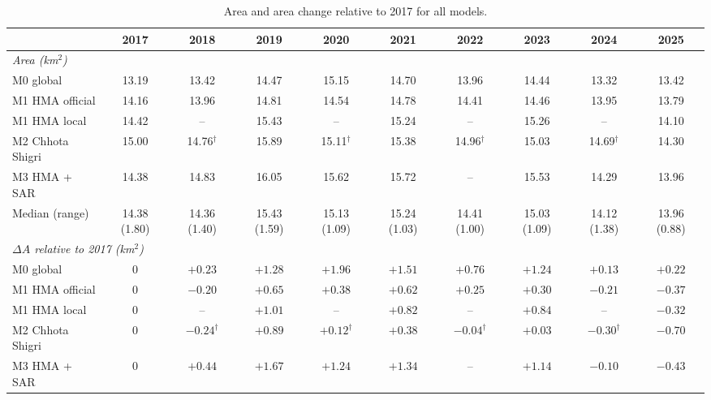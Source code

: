 \documentclass[10pt]{article}
\newcommand{\kmsq}{km$^2$}
\newcommand{\tr}{$^\dagger$}   %
\begin{document}
\begin{table}
\centering\footnotesize
\setlength{\tabcolsep}{3.5pt}
\begin{threeparttable}
\caption{Area and area change relative to 2017 for all models.}
\label{tab:all_models}
\begin{tabular}{l ccccccccc}
\toprule
 & \textbf{2017} & \textbf{2018} & \textbf{2019} & \textbf{2020} & \textbf{2021} & \textbf{2022} & \textbf{2023} & \textbf{2024} & \textbf{2025} \\
\midrule
\multicolumn{10}{l}{\textit{Area (\kmsq)}} \\
M0 global                          & 13.19 & 13.42 & 14.47 & 15.15 & 14.70 & 13.96 & 14.44 & 13.32 & 13.42 \\
M1 HMA official                    & 14.16 & 13.96 & 14.81 & 14.54 & 14.78 & 14.41 & 14.46 & 13.95 & 13.79 \\
M1 HMA local                       & 14.42 & -- & 15.43 & -- & 15.24 & -- & 15.26 & -- & 14.10 \\
M2 Chhota Shigri                   & 15.00 & 14.76\tr & 15.89 & 15.11\tr & 15.38 & 14.96\tr & 15.03 & 14.69\tr & 14.30 \\
M3 HMA + SAR                       & 14.38 & 14.83 & 16.05 & 15.62 & 15.72 & -- & 15.53 & 14.29 & 13.96 \\
Median (range)                     & 14.38 (1.80) & 14.36 (1.40) & 15.43 (1.59) & 15.13 (1.09) & 15.24 (1.03) & 14.41 (1.00) & 15.03 (1.09) & 14.12 (1.38) & 13.96 (0.88) \\
\midrule
\multicolumn{10}{l}{\textit{$\Delta A$ relative to 2017 (\kmsq)}} \\
M0 global                          & 0 & $+0.23$ & $+1.28$ & $+1.96$ & $+1.51$ & $+0.76$ & $+1.24$ & $+0.13$ & $+0.22$ \\
M1 HMA official                    & 0 & $-0.20$ & $+0.65$ & $+0.38$ & $+0.62$ & $+0.25$ & $+0.30$ & $-0.21$ & $-0.37$ \\
M1 HMA local                       & 0 & -- & $+1.01$ & -- & $+0.82$ & -- & $+0.84$ & -- & $-0.32$ \\
M2 Chhota Shigri                   & 0 & $-0.24$\tr & $+0.89$ & $+0.12$\tr & $+0.38$ & $-0.04$\tr & $+0.03$ & $-0.30$\tr & $-0.70$ \\
M3 HMA + SAR                       & 0 & $+0.44$ & $+1.67$ & $+1.24$ & $+1.34$ & -- & $+1.14$ & $-0.10$ & $-0.43$ \\

\end{tabular}
\end{threeparttable}
\end{table}
\end{document}
